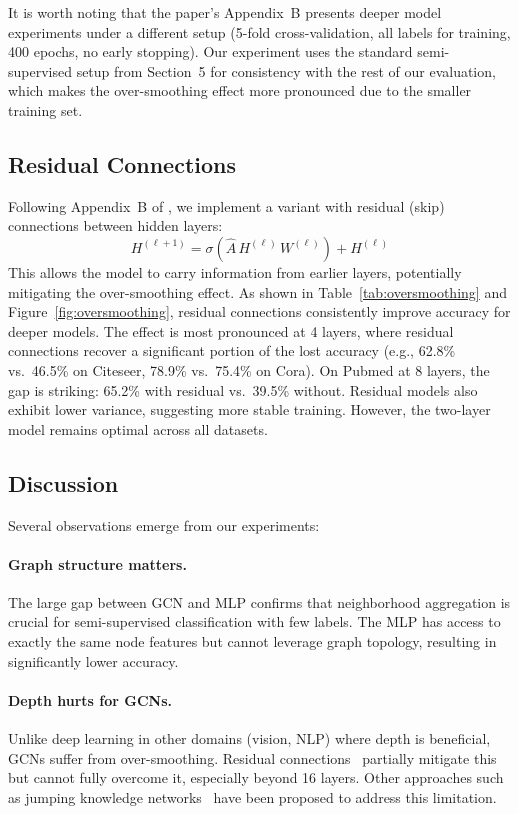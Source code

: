 \documentclass[10pt,twocolumn]{article}
\begin{document}
It is worth noting that the paper's Appendix~B presents deeper model experiments under a different setup (5-fold cross-validation, all labels for training, 400 epochs, no early stopping).
Our experiment uses the standard semi-supervised setup from Section~5 for consistency with the rest of our evaluation, which makes the over-smoothing effect more pronounced due to the smaller training set.

\subsection{Residual Connections}

Following Appendix~B of \citet{kipf2017semi}, we implement a variant with residual (skip) connections between hidden layers:
\begin{equation}
    H^{(\ell+1)} = \sigma\!\left(\hat{A}\,H^{(\ell)}\,W^{(\ell)}\right) + H^{(\ell)}
    \label{eq:residual}
\end{equation}
This allows the model to carry information from earlier layers, potentially mitigating the over-smoothing effect.
As shown in Table~\ref{tab:oversmoothing} and Figure~\ref{fig:oversmoothing}, residual connections consistently improve accuracy for deeper models.
The effect is most pronounced at 4 layers, where residual connections recover a significant portion of the lost accuracy (e.g., 62.8\% vs.\ 46.5\% on Citeseer, 78.9\% vs.\ 75.4\% on Cora).
On Pubmed at 8 layers, the gap is striking: 65.2\% with residual vs.\ 39.5\% without.
Residual models also exhibit lower variance, suggesting more stable training.
However, the two-layer model remains optimal across all datasets.

\subsection{Discussion}

Several observations emerge from our experiments:

\paragraph{Graph structure matters.} The large gap between GCN and MLP confirms that neighborhood aggregation is crucial for semi-supervised classification with few labels.
The MLP has access to exactly the same node features but cannot leverage graph topology, resulting in significantly lower accuracy.

\paragraph{Depth hurts for GCNs.} Unlike deep learning in other domains (vision, NLP) where depth is beneficial, GCNs suffer from over-smoothing.
Residual connections~\citep{li2019deepgcns} partially mitigate this but cannot fully overcome it, especially beyond 16 layers. Other approaches such as jumping knowledge networks~\citep{xu2018representation} have been proposed to address this limitation.
\end{document}
